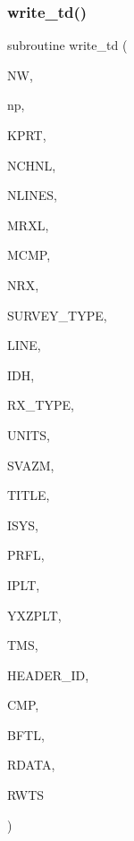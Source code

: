 \subsubsection{\texorpdfstring{write\+\_\+td()}{write\_td()}}
{\footnotesize\ttfamily subroutine write\+\_\+td (\begin{DoxyParamCaption}\item[{integer}]{NW,  }\item[{integer}]{np,  }\item[{integer}]{K\+P\+RT,  }\item[{integer}]{N\+C\+H\+NL,  }\item[{integer}]{N\+L\+I\+N\+ES,  }\item[{integer}]{M\+R\+XL,  }\item[{integer}]{M\+C\+MP,  }\item[{integer, dimension(nlines)}]{N\+RX,  }\item[{integer}]{S\+U\+R\+V\+E\+Y\+\_\+\+T\+Y\+PE,  }\item[{integer, dimension(nlines)}]{L\+I\+NE,  }\item[{integer, dimension(nlines)}]{I\+DH,  }\item[{integer, dimension(nlines)}]{R\+X\+\_\+\+T\+Y\+PE,  }\item[{integer, dimension(nlines)}]{U\+N\+I\+TS,  }\item[{real, dimension(nlines)}]{S\+V\+A\+ZM,  }\item[{character(len=120)}]{T\+I\+T\+LE,  }\item[{integer}]{I\+S\+YS,  }\item[{integer}]{P\+R\+FL,  }\item[{integer, dimension(nlines)}]{I\+P\+LT,  }\item[{real(kind=ql), dimension(3,mrxl,nlines)}]{Y\+X\+Z\+P\+LT,  }\item[{real, dimension(nchnl)}]{T\+MS,  }\item[{integer, dimension(nlines)}]{H\+E\+A\+D\+E\+R\+\_\+\+ID,  }\item[{integer, dimension(nlines)}]{C\+MP,  }\item[{real, dimension(nchnl,mrxl,mcmp,nlines)}]{B\+F\+TL,  }\item[{real, dimension(nchnl,mrxl,mcmp,nlines)}]{R\+D\+A\+TA,  }\item[{integer, dimension(nchnl,mrxl,mcmp,nlines)}]{R\+W\+TS }\end{DoxyParamCaption})}

